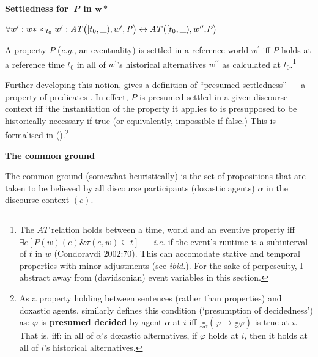 \documentclass[12pt,dvipsnames]{report}
\begin{document}
\pex \textbf{Settledness for\textbf{\textit{\ P}} in $ \boldsymbol{w*}$}


$\forall w^{\prime}:w*\approx_{t_0}w^{\prime}:\\\mathit{AT}\big([t_0,\_),w^\prime, \mathit P\big)\leftrightarrow \mathit{AT}\big([t_0,\_),w^{\prime\prime},\mathit{\!P}\big)$%


A property $P$ (\textit{e.g.}, an eventuality) is settled in a reference world $w^\prime$ iff $\mathit P$ holds at a reference time $t_0$ in all of $w^\prime$'s historical alternatives $w^{\prime\prime}$ as calculated at $t_0$.\footnote{The $AT$ relation holds between a time, world and an eventive property iff $\exists e[\mathit P(w)(e)\&\tau(e,w)\subseteq t]$ --- \textit{i.e.} if the event's runtime is a subinterval of $t$ in $w$ (Condoravdi 2002:70). This can accomodate stative and temporal properties with minor adjustments (see \textit{ibid.}). For the sake of perpescuity, I abstract away from (davidsonian) event variables in this section.}
\xe

\noindent Further developing this notion, \citet[82]{Condoravdi2002} gives a definition of ``presumed settledness'' --- a property of predicates \citep[see also][]{Kaufmann2002,Kaufmann2005}. In effect, $ P $ is presumed settled in a given discourse context iff `the instantiation of the property it applies to is presupposed to be historically necessary if true (or equivalently, impossible if false.) This is formalised in ().\footnote{As a property holding between sentences (rather than properties) and doxastic agents, \citeauthor{Kaufmann2005} similarly defines this condition (`presumption of decidedness') as:
	\exdisplay$\varphi $ is \textbf{presumed decided} by agent $ \alpha $ at $ i $ iff $\underset{\sim\alpha}{\square}(\varphi\to\underset{\approx}{\square}\varphi) $ is true at $ i $.\\
	That is, iff: in all of $ \alpha$'s doxastic alternatives, if $ \varphi $ holds at $ i $, then it holds at all of $ i $'s historical alternatives.\xe\label{K05-presump}
}


\pex[nopreamble]\a \textbf{The common ground}

The common ground (somewhat heuristically) is the set of propositions that are taken to be believed by all discourse participants (doxastic agents) $ \alpha $ in the discourse context $ (c) $.
\end{document}
